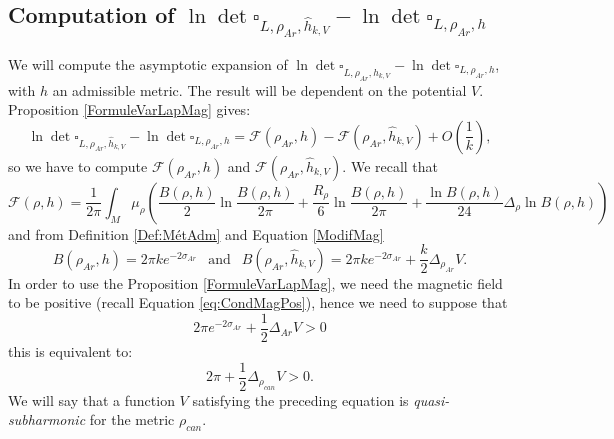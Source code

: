 \documentclass{article}
\theoremstyle{definition}
\theoremstyle{remark}
\begin{document}
\subsection{Computation of $\ln \det\square_{L,\rho_{Ar},\hat{h}_{k,V}}-\ln \det\square_{L,\rho_{Ar},h}$}
We will compute the asymptotic expansion of $\ln \det\square_{L,\rho_{Ar},\hat{h}_{k,V}}-\ln \det\square_{L,\rho_{Ar},h}$, with $h$ an admissible metric. The result will be dependent on the potential $V.$ Proposition \ref{FormuleVarLapMag} gives:
\begin{equation}
    \ln \det\square_{L,\rho_{Ar},\hat{h}_{k,V}}-\ln \det\square_{L,\rho_{Ar},h}=\mathcal{F}\left(\rho_{Ar},h \right)-\mathcal{F}\left(\rho_{Ar},\hat{h}_{k,V} \right)+O\left(\frac{1}{k}\right),
\end{equation}
    so we have to compute $\mathcal{F}\left(\rho_{Ar},h \right)$ and $\mathcal{F}\left(\rho_{Ar},\hat{h}_{k,V} \right).$ We recall that $$\mathcal{F}(\rho,h)=\frac{1}{2\pi}\int_{M}\mu_{\rho} \left( \frac{B(\rho,h)}{2}\ln \frac{B(\rho,h)}{2\pi}+\frac{R_{\rho}}{6}\ln \frac{B(\rho,h)}{2\pi}+\frac{\ln B(\rho,h)}{24}\Delta_{\rho} \ln B(\rho,h )\right)$$ and from Definition \ref{Def:MétAdm} and Equation \eqref{ModifMag} $$B(\rho_{Ar},h)=2\pi ke^{-2\sigma_{Ar}} ~~ \text{ and } ~~ B(\rho_{Ar},\hat{h}_{k,V})=2\pi k e^{-2\sigma_{Ar}}+\frac{k}{2}\Delta_{\rho_{Ar}}V.$$ In order to use the Proposition \ref{FormuleVarLapMag}, we need the magnetic field to be positive (recall Equation \eqref{eq:CondMagPos}), hence we need to suppose that $$2\pi e^{-2\sigma_{Ar}}+\frac{1}{2}\Delta_{Ar}V>0$$ this is equivalent to: \begin{equation}\label{ConditionV}
    2\pi +\frac{1}{2}\Delta_{\rho_{can}}V>0.
\end{equation}
We will say that a function $V$ satisfying the preceding equation is \emph{quasi-subharmonic} for the metric $\rho_{can}.$
 
\end{document}
